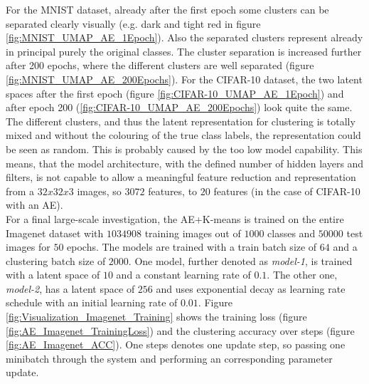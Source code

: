 \documentclass[12pt,DIV14,BCOR12mm,a4paper,footexclude,headinclude,halfparskip-,twoside,openright,cleardoubleempty,idxtotoc,bibtotoc,listtotoc,abstracton]{scrreprt} %
\numberwithin{equation}{chapter}
\begin{document}
For the MNIST dataset, already after the first epoch some clusters can be separated clearly visually (e.g. dark and tight red in figure \ref{fig:MNIST_UMAP_AE_1Epoch}). Also the separated clusters represent already in principal purely the original classes. The cluster separation is increased further after 200 epochs, where the different clusters are well separated (figure \ref{fig:MNIST_UMAP_AE_200Epochs}). For the CIFAR-10 dataset, the two latent spaces after the first epoch (figure \ref{fig:CIFAR-10_UMAP_AE_1Epoch}) and after epoch 200 (\ref{fig:CIFAR-10_UMAP_AE_200Epochs}) look quite the same. The different clusters, and thus the latent representation for clustering is totally mixed and without the colouring of the true class labels, the representation could be seen as random. This is probably caused by the too low model capability. This means, that the model architecture, with the defined number of hidden layers and filters, is not capable to allow a meaningful feature reduction and representation from a $32x32x3$ images, so $3072$ features, to $20$ features (in the case of CIFAR-10 with an AE).\\
For a final large-scale investigation, the AE+K-means is trained on the entire Imagenet dataset with $1034908$ training images out of $1000$ classes and $50000$ test images \cite{imagenet_cvpr09} for $50$ epochs. The models are trained with a train batch size of $64$ and a clustering batch size of $2000$. One model, further denoted as \textit{model-1}, is trained with a latent space of $10$ and a constant learning rate of $0.1$. The other one, \textit{model-2}, has a latent space of $256$ and uses exponential decay as learning rate schedule with an initial learning rate of $0.01$. Figure \ref{fig:Visualization_Imagenet_Training} shows the training loss (figure \ref{fig:AE_Imagenet_TrainingLoss}) and the clustering accuracy over steps (figure \ref{fig:AE_Imagenet_ACC}). One steps denotes one update step, so passing one minibatch through the system and performing an corresponding parameter update.
\end{document}

